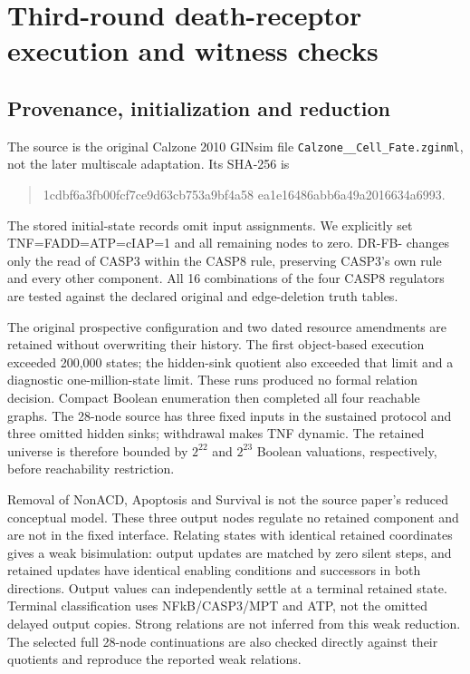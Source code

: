 \section{Third-round death-receptor execution and witness checks}

\subsection{Provenance, initialization and reduction}
The source is the original Calzone 2010 GINsim file
\texttt{Calzone\_\_Cell\_Fate.zginml}, not the later multiscale adaptation.
Its SHA-256 is
\begin{quote}\small\ttfamily
1cdbf6a3fb00fcf7ce9d63cb753a9bf4a58\allowbreak
ea1e16486abb6a49a2016634a6993.
\end{quote}
The stored initial-state records omit input assignments. We explicitly set
TNF=FADD=ATP=cIAP=1 and all remaining nodes to zero. DR-FB- changes only the
read of CASP3 within the CASP8 rule, preserving CASP3's own rule and every
other component. All 16 combinations of the four CASP8 regulators are tested
against the declared original and edge-deletion truth tables.

The original prospective configuration and two dated resource amendments are
retained without overwriting their history. The first object-based execution
exceeded 200,000 states; the hidden-sink quotient also exceeded that limit and
a diagnostic one-million-state limit. These runs produced no formal relation
decision. Compact Boolean enumeration then completed all four reachable
graphs. The 28-node source has three fixed inputs in the sustained protocol
and three omitted hidden sinks; withdrawal makes TNF dynamic. The retained
universe is therefore bounded by $2^{22}$ and $2^{23}$ Boolean valuations,
respectively, before reachability restriction.

Removal of NonACD, Apoptosis and Survival is not the source paper's reduced
conceptual model. These three output nodes regulate no retained component and
are not in the fixed interface. Relating states with identical retained
coordinates gives a weak bisimulation: output updates are matched by zero
silent steps, and retained updates have identical enabling conditions and
successors in both directions. Output values can independently settle at a
terminal retained state. Terminal classification uses NFkB/CASP3/MPT and ATP,
not the omitted delayed output copies. Strong relations are not inferred from
this weak reduction. The selected full 28-node continuations are also checked
directly against their quotients and reproduce the reported weak relations.

